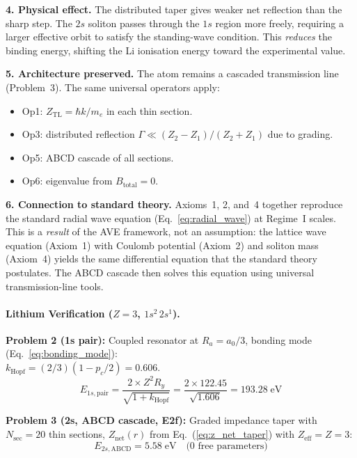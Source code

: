 \noindent\textbf{4. Physical effect.}
The distributed taper gives weaker net reflection
than the sharp step.  The $2s$ soliton passes
through the $1s$ region more freely, requiring a
larger effective orbit to satisfy the standing-wave
condition.  This \emph{reduces} the binding energy,
shifting the Li ionisation energy toward the
experimental value.

\noindent\textbf{5. Architecture preserved.}
The atom remains a cascaded transmission line
(Problem~3).  The same universal operators apply:
\begin{itemize}
    \item Op1: $Z_{\text{TL}} = \hbar k / m_e$
          in each thin section.
    \item Op3: distributed reflection
          $\Gamma \ll (Z_2 - Z_1) / (Z_2 + Z_1)$
          due to grading.
    \item Op5: ABCD cascade of all sections.
    \item Op6: eigenvalue from
          $B_{\text{total}} = 0$.
\end{itemize}

\noindent\textbf{6. Connection to standard theory.}
Axioms~1, 2, and~4 together reproduce the
standard radial wave equation
(Eq.~\ref{eq:radial_wave}) at Regime~I scales.
This is a \emph{result} of the AVE framework,
not an assumption: the lattice wave equation
(Axiom~1) with Coulomb potential (Axiom~2) and
soliton mass (Axiom~4) yields the same
differential equation that the standard theory
postulates.  The ABCD cascade then solves this
equation using universal transmission-line tools.

\paragraph{Lithium Verification ($Z=3$, $1s^2\,2s^1$).}

\noindent\textbf{Problem 2 (1s pair):} Coupled resonator
at $R_a = a_0/3$, bonding mode
(Eq.~\ref{eq:bonding_mode}):\\
$k_{\text{Hopf}} = (2/3)(1 - p_c/2) = 0.606$.
\begin{equation}
    E_{1s,\text{pair}} = \frac{2 \times Z^2 R_y}
    {\sqrt{1 + k_{\text{Hopf}}}}
    = \frac{2 \times 122.45}{\sqrt{1.606}}
    = 193.28\;\text{eV}
\end{equation}

\noindent\textbf{Problem 3 (2s, ABCD cascade, E2f):}
Graded impedance taper with $N_{\text{sec}} = 20$
thin sections, $Z_{\text{net}}(r)$ from
Eq.~(\ref{eq:z_net_taper}) with $Z_{\text{eff}} = Z = 3$:
\begin{equation}
    E_{2s,\text{ABCD}} = 5.58\;\text{eV}
    \quad\text{(0 free parameters)}
\end{equation}

